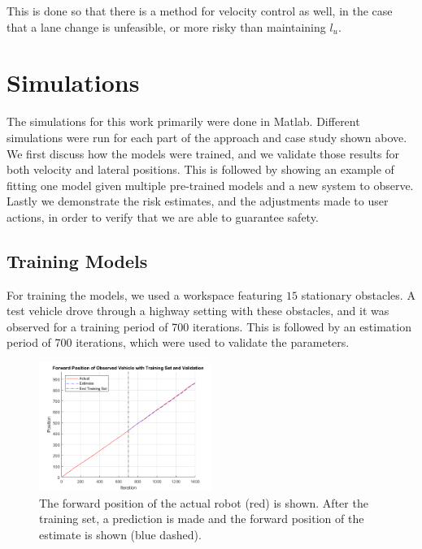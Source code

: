 \documentclass[conference]{IEEEtran}
\begin{document}
This is done so that there is a method for velocity control as well, in the case that a lane change is unfeasible, or more risky than maintaining $l_u$.


\section{Simulations}
The simulations for this work primarily were done in Matlab. Different simulations were run for each part of the approach and case study shown above. We first discuss how the models were trained, and we validate those results for both velocity and lateral positions. This is followed by showing an example of fitting one model given multiple pre-trained models and a new system to observe. Lastly we demonstrate the risk estimates, and the adjustments made to user actions, in order to verify that we are able to guarantee safety.

\subsection{Training Models}
For training the models, we used a workspace featuring $15$ stationary obstacles. A test vehicle drove through a highway setting with these obstacles, and it was observed for a training period of 700 iterations. This is followed by an estimation period of 700 iterations, which were used to validate the parameters.

\begin{figure}[ht]
    \includegraphics[width=0.5\textwidth]{train1.png}
    \caption{The forward position of the actual robot (red) is shown. After the training set, a prediction is made and the forward position of the estimate is shown (blue dashed).}
    \label{fig:train1}
\end{figure}
\end{document}
